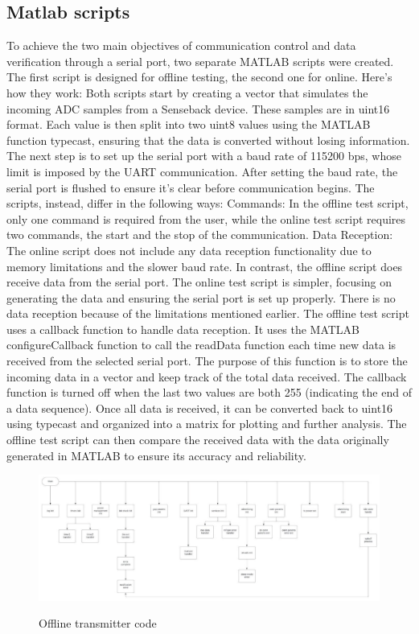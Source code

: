\documentclass{Configuration_Files/PoliMi3i_thesis}
\begin{document}
\subsection{Matlab scripts}

To achieve the two main objectives of communication control and data verification through a serial port, two separate MATLAB scripts were created. The first script is designed for offline testing, the second one for online. Here's how they work:
Both scripts start by creating a vector that simulates the incoming ADC samples from a Senseback device. These samples are in uint16 format. Each value is then split into two uint8 values using the MATLAB function typecast, ensuring that the data is converted without losing information. The next step is to set up the serial port with a baud rate of 115200 bps, whose limit is imposed by the UART communication. After setting the baud rate, the serial port is flushed to ensure it's clear before communication begins.
The scripts, instead, differ in the following ways:
Commands: In the offline test script, only one command is required from the user, while the online test script requires two commands, the start and the stop of the communication.
Data Reception: The online script does not include any data reception functionality due to memory limitations and the slower baud rate. In contrast, the offline script does receive data from the serial port.
The online test script is simpler, focusing on generating the data and ensuring the serial port is set up properly. There is no data reception because of the limitations mentioned earlier.
The offline test script uses a callback function to handle data reception. It uses the MATLAB configureCallback function to call the readData function each time new data is received from the selected serial port. The purpose of this function is to store the incoming data in a vector and keep track of the total data received. The callback function is turned off when the last two values are both 255 (indicating the end of a data sequence). Once all data is received, it can be converted back to uint16 using typecast and organized into a matrix for plotting and further analysis. The offline test script can then compare the received data with the data originally generated in MATLAB to ensure its accuracy and reliability.

\begin{figure}[H]
	\includegraphics[scale=0.3]{Previous Implementation/Screenshot 2024-08-15 at 10.59.58.png}
	\centering
    \label{prev_3}
    \caption{Offline transmitter code}
\end{figure}
\end{document}
